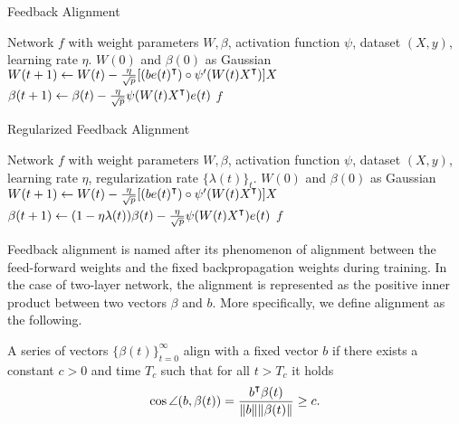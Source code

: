 \begin{minipage}{0.49\textwidth}
\begin{algorithm}[H]
\centering
\caption{Feedback Alignment}\label{algo:fa}
    \begin{algorithmic}[1]
        \Require Network $f$ with weight parameters $W,\beta$, activation function $\psi$, dataset $(X,y)$, learning rate $\eta$.
         $W(0)$ and $\beta(0)$ as Gaussian
            \State $W(t+1) \gets W(t) - \frac{\eta}{\sqrt p}[(b e(t)\transpose)\circ \psi'(W(t)X\transpose)] X$
            \State $\beta(t+1) \gets \beta(t) - \frac{\eta}{\sqrt p} \psi(W(t)X\transpose) e(t)$
        \EndWhile
        \State \Return $f$
    \end{algorithmic}    
\end{algorithm}
\end{minipage}
\hfill
\begin{minipage}{0.49\textwidth}
\begin{algorithm}[H]
\centering
\caption{Regularized Feedback Alignment}\label{algo:fa-reg}
    \begin{algorithmic}[1]
        \Require Network $f$ with weight parameters $W,\beta$, activation function $\psi$, dataset $(X,y)$, learning rate $\eta$, regularization rate $\{\lambda(t)\}_t$.
         $W(0)$ and $\beta(0)$ as Gaussian
            \State $W(t+1) \gets W(t) - \frac{\eta}{\sqrt p}[(b e(t)\transpose)\circ \psi'(W(t)X\transpose)] X$
            \State $\beta(t+1) \gets (1-\eta\lambda(t))\beta(t) - \frac{\eta}{\sqrt p} \psi(W(t)X\transpose) e(t)$
        \EndWhile
        \State \Return $f$
    \end{algorithmic}    
\end{algorithm}
\end{minipage}

Feedback alignment is named after its phenomenon of alignment between the feed-forward weights and the fixed backpropagation weights during training. In the case of two-layer network, the alignment is represented as the positive inner product between two vectors $\beta$ and $b$. More specifically, we define alignment as the following.
\begin{definition}\label{def:alignment}
    A series of vectors $\{\beta(t)\}_{t=0}^\infty$ align with a fixed vector $b$ if there exists a constant $c>0$ and time $T_c$ such that for all $t > T_c$ it holds
    \begin{align*}
        \cos\angle(b, \beta(t)) = \frac{b\transpose \beta(t)}{\|b\|\|\beta(t)\|} \geq c.
    \end{align*}
\end{definition}